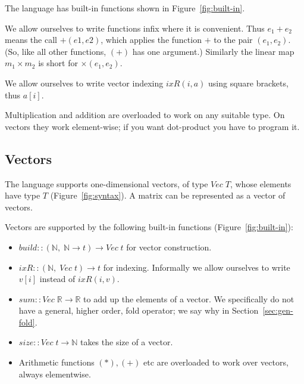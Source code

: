 \documentclass[sigplan,review]{acmart}
\renewcommand{\to}{\rightarrow}    %
\newcommand{\buildfun}{\mathit{build}}
\newcommand{\sumfunname}{\mathit{sum}}   %
\newcommand{\sumfun}[1]{\sumfunname(#1)}   %
\newcommand{\sizefun}{size}
\newcommand{\deltafun}[2]{\delta(#1,#2)}
\newcommand{\indexfunname}{\mathit{ixR}} %
\newcommand{\indexfun}[2]{\indexfunname(#2,#1)} %
\renewcommand{\vector}[1]{\mathit{Vec}\;#1}
\newcommand{\real}{\mathbb{R}}       %
\newcommand{\nat}{\mathbb{N}}        %
\newcommand{\lmcomp}{\,\circ\,}   %
\newcommand{\lmpair}{\times}         %
\newcommand{\lmapply}{\,\odot\,}      %
\newcommand{\lmbuildt}{\mathcal B'}             %
\newcommand{\simon}[1]{}
\newcommand{\tom}[1]{}
\begin{document}
The language has built-in functions shown in Figure~\ref{fig:built-in}.

We allow ourselves to write functions infix where it is convenient.
Thus $e_1 + e_2$ means the call $+(e1,e2)$, which applies the function $+$ to
the pair $(e_1,e_2)$.  (So, like all other functions, $(+)$ has one argument.)
Similarly the linear map $m_1 \lmpair m_2$ is short for $\lmpair(e_1,e_2)$.

We allow ourselves to write vector indexing $\indexfun{a}{i}$ using square brackets, thus $a[i]$.

Multiplication and addition are overloaded to work on any suitable type.
On vectors they work element-wise; if you want dot-product you have to program it.



\subsection{Vectors}

The language supports one-dimensional vectors, of type $\vector{T}$,
whose elements have type $T$ (Figure~\ref{fig:syntax}).
A matrix can be represented as a vector of vectors.

Vectors are supported by the following built-in functions (Figure~\ref{fig:built-in}):
\begin{itemize}
\item $\buildfun :: (\nat,\; \nat \to t) \to \vector{t}$ for vector construction.
\item $\indexfunname :: (\nat,\; \vector{t}) \to t$ for indexing.  Informally we allow ourselves to write
  $v[i]$ instead of $\indexfun{v}{i}$.
\item $\sumfunname :: \vector{\real} \to \real$ to add up the elements of a vector.
We specifically do not have a general, higher order, fold operator;
we say why in Section~\ref{sec:gen-fold}.
  \tom{I believe that for a vector $v$ of size $n$, $\sumfun{v}$ is the
    same as $\lmbuildt(n, const~ id)~ v$.  This may or may not be useful
    in reducing the size of the base language, should we want to do that.}
  \simon{I don't think so!  $\lmbuildt$ is a linear map, so you can't apply it to $v$.
    Maybe you mean $\lmbuildt(n, const~ id) \lmapply v$?  But that (Figure~\ref{fig:lm-laws}) is
    defined using $\sumfunname$!}
\item $\sizefun :: \vector{t} \to \nat$ takes the size of a vector.
\item Arithmetic functions $(*), (+)$ etc are overloaded to work over vectors, always elementwise.
\end{itemize}
\end{document}
